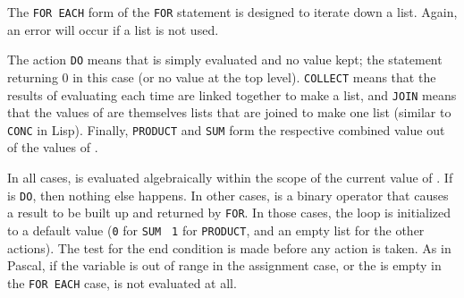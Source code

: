 The \texttt{FOR EACH} form of the \texttt{FOR} statement is
designed to iterate down a list.  Again, an error will occur if a list is
not used.

The action \texttt{DO} means that  is simply
evaluated and no value kept; the statement returning 0 in this case (or no
value at the top level). \texttt{COLLECT} means that the results of
evaluating  each time are linked together to make a list,
and \texttt{JOIN} means that the values of  are themselves
lists that are joined to make one list (similar to \texttt{CONC} in Lisp).
Finally, \texttt{PRODUCT} and \texttt{SUM}
form the respective combined value out of the values of .

In all cases,  is evaluated algebraically within the
scope of the current value of .  If  is
\texttt{DO}, then nothing else happens.  In other cases, 
is a binary operator that causes a result to be built up and
returned by \texttt{FOR}.  In those cases, the loop is
initialized to a default value (\texttt{0} for \texttt{SUM} {\tt
1} for \texttt{PRODUCT}, and an empty list for the other
actions).  The test for the end condition is made before any action is
taken.  As in Pascal, if the variable is out of range in the assignment
case, or the  is empty in the \texttt{FOR EACH}
case,  is not evaluated at all.

